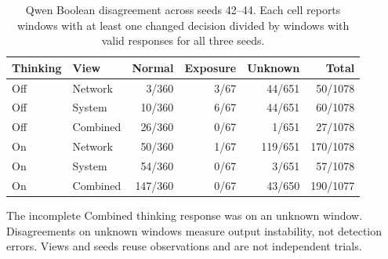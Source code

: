 \begin{table}[t]
\centering\small
\caption{Qwen Boolean disagreement across seeds 42--44. Each cell reports windows with at least one changed decision divided by windows with valid responses for all three seeds.}
\label{tab:seed_breakdown}
\begin{tabular}{@{}llrrrr@{}}
\toprule
Thinking & View & Normal & Exposure & Unknown & Total \\
\midrule
Off & Network & 3/360 & 3/67 & 44/651 & 50/1078 \\
Off & System & 10/360 & 6/67 & 44/651 & 60/1078 \\
Off & Combined & 26/360 & 0/67 & 1/651 & 27/1078 \\
On & Network & 50/360 & 1/67 & 119/651 & 170/1078 \\
On & System & 54/360 & 0/67 & 3/651 & 57/1078 \\
On & Combined & 147/360 & 0/67 & 43/650 & 190/1077 \\
\bottomrule
\end{tabular}
\par\smallskip
\parbox{\textwidth}{\footnotesize The incomplete Combined thinking response was on an unknown window. Disagreements on unknown windows measure output instability, not detection errors. Views and seeds reuse observations and are not independent trials.}
\end{table}
